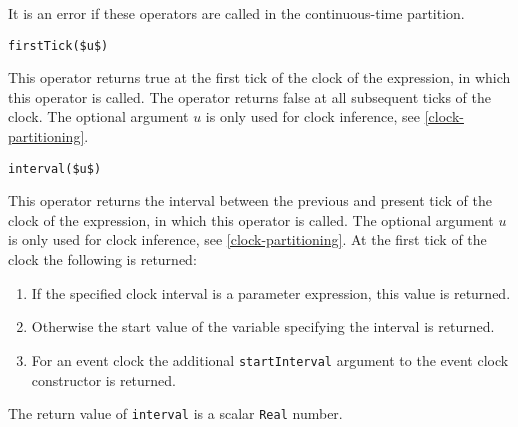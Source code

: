 It is an error if these operators are called in the continuous-time partition.

\begin{operatordefinition}[firstTick]
\begin{synopsis}\begin{lstlisting}
firstTick($u$)
\end{lstlisting}\end{synopsis}
\begin{semantics}
This operator returns true at the first tick of the clock of the expression, in which this operator is called.
The operator returns false at all subsequent ticks of the clock.
The optional argument $u$ is only used for clock inference, see \cref{clock-partitioning}.
\end{semantics}
\end{operatordefinition}

\begin{operatordefinition}[interval]
\begin{synopsis}\begin{lstlisting}
interval($u$)
\end{lstlisting}\end{synopsis}
\begin{semantics}
This operator returns the interval between the previous and present tick of the clock of the expression, in which this operator is called.
The optional argument $u$ is only used for clock inference, see \cref{clock-partitioning}.
At the first tick of the clock the following is returned:
\begin{enumerate}
\item If the specified clock interval is a parameter expression, this value is returned.
\item Otherwise the start value of the variable specifying the interval is returned.
\item For an event clock the additional \lstinline!startInterval! argument to the event clock constructor is returned.
\end{enumerate}
The return value of \lstinline!interval! is a scalar \lstinline!Real! number.
\end{semantics}
\end{operatordefinition}

